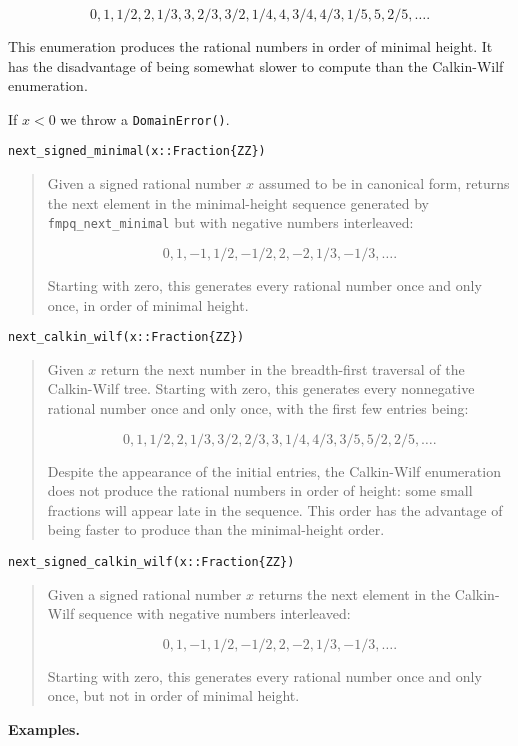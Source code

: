 \documentclass[a4paper,10pt]{article}
\newcommand{\code}{\lstinline}
\newcommand{\desc}[1]{\vspace{-3mm}\begin{quote}#1\end{quote}}
\begin{document}
{{{{$$0, 1, 1/2, 2, 1/3, 3, 2/3, 3/2, 1/4, 4, 3/4, 4/3, 1/5, 5, 2/5, \ldots.$$

This enumeration produces the rational numbers in order of minimal height. 
It has the disadvantage of being somewhat slower to compute than the
Calkin-Wilf enumeration.

If $x < 0$ we throw a \code{DomainError()}.}

\begin{lstlisting}
next_signed_minimal(x::Fraction{ZZ})
\end{lstlisting}

\desc{Given a signed rational number $x$ assumed to be in canonical form, 
returns the next element in the minimal-height sequence generated by 
\code{fmpq_next_minimal} but with negative numbers interleaved:

$$0, 1, -1, 1/2, -1/2, 2, -2, 1/3, -1/3, \ldots.$$

Starting with zero, this generates every rational number once and only once,
in order of minimal height.}

\begin{lstlisting}
next_calkin_wilf(x::Fraction{ZZ})
\end{lstlisting}

\desc{Given $x$ return the next number in the breadth-first traversal of the
Calkin-Wilf tree. Starting with zero, this generates every nonnegative
rational number once and only once, with the first few entries being:

$$0, 1, 1/2, 2, 1/3, 3/2, 2/3, 3, 1/4, 4/3, 3/5, 5/2, 2/5, \ldots.$$

Despite the appearance of the initial entries, the Calkin-Wilf enumeration 
does not produce the rational numbers in order of height: some small fractions
will appear late in the sequence. This order has the advantage of being faster 
to produce than the minimal-height order.}

\begin{lstlisting}
next_signed_calkin_wilf(x::Fraction{ZZ})
\end{lstlisting}

\desc{Given a signed rational number $x$ returns the next element in the
Calkin-Wilf sequence with negative numbers interleaved:

$$0, 1, -1, 1/2, -1/2, 2, -2, 1/3, -1/3, \ldots.$$

Starting with zero, this generates every rational number once and only once,
but not in order of minimal height.}

\textbf{Examples.}

}}}
\end{document}
